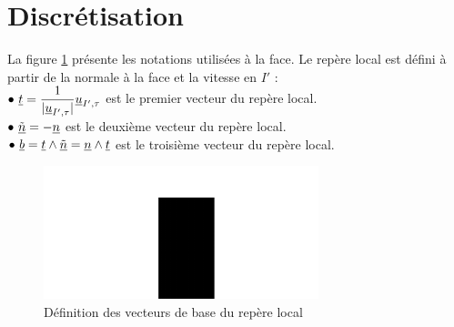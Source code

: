 %
%
%
%
%
%
%
%

\section{Discr\'etisation}

La figure \ref{Base_Clsyvt_fig_facesym} pr\'esente les notations utilis\'ees \`a la face. Le
rep\`ere local est d\'efini \`a partir de la normale \`a la face et la vitesse
en $I'$ :\\
$\bullet\ \displaystyle\underline{t}
=\frac{1}{|\underline{u}_{I',\tau}|}\underline{u}_{I',\tau}$ est le
premier vecteur du rep\`ere local.\\
$\bullet\ \underline{\tilde{n}}=-\underline{n}$ est le deuxi\`eme vecteur du rep\`ere
local.\\
$\bullet\ \vect{b}=\vect{t}\wedge\vect{\tilde{n}}=\vect{n}\wedge\vect{t}$ est le
troisi\`eme vecteur du rep\`ere local.

\begin{figure}[h]
\centerline{\includegraphics[width=8cm]{../Base/Clsyvt/Images/facesym.pdf}}
\caption{\label{Base_Clsyvt_fig_facesym}D\'efinition des vecteurs de base du rep\`ere local}
\end{figure}

